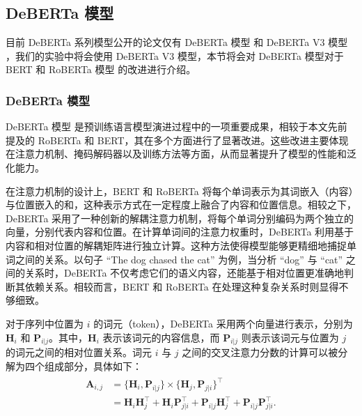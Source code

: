 \subsection{DeBERTa 模型}
\label{sec:method-pretrain-deberta}

目前 DeBERTa 系列模型公开的论文仅有 DeBERTa 模型 \cite{he_deberta_2021} 和 DeBERTa V3 模型 \cite{he2023debertav3improvingdebertausing}，我们的实验中将会使用 DeBERTa V3 模型，本节将会对 DeBERTa 模型对于 BERT \cite{devlin_bert_2019} 和 RoBERTa 模型 \cite{liu_roberta_2019} 的改进进行介绍。

\subsubsection{DeBERTa 模型}

DeBERTa 模型 \cite{he_deberta_2021} 是预训练语言模型演进过程中的一项重要成果，相较于本文先前提及的 RoBERTa 和 BERT，其在多个方面进行了显著改进。这些改进主要体现在注意力机制、掩码解码器以及训练方法等方面，从而显著提升了模型的性能和泛化能力。

在注意力机制的设计上，BERT 和 RoBERTa 将每个单词表示为其词嵌入（内容）与位置嵌入的和，这种表示方式在一定程度上融合了内容和位置信息。相较之下，DeBERTa 采用了一种创新的解耦注意力机制，将每个单词分别编码为两个独立的向量，分别代表内容和位置。在计算单词间的注意力权重时，DeBERTa 利用基于内容和相对位置的解耦矩阵进行独立计算。这种方法使得模型能够更精细地捕捉单词之间的关系。以句子 “The dog chased the cat” 为例，当分析 “dog” 与 “cat” 之间的关系时，DeBERTa 不仅考虑它们的语义内容，还能基于相对位置更准确地判断其依赖关系。相较而言，BERT 和 RoBERTa 在处理这种复杂关系时则显得不够细致。

对于序列中位置为 \(i\) 的词元（token），DeBERTa 采用两个向量进行表示，分别为 \(\mathbf{H}_{i}\) 和 \(\mathbf{P}_{i|j}\)。其中，\(\mathbf{H}_{i}\) 表示该词元的内容信息，而 \(\mathbf{P}_{i|j}\) 则表示该词元与位置为 \(j\) 的词元之间的相对位置关系。词元 \(i\) 与 \(j\) 之间的交叉注意力分数的计算可以被分解为四个组成部分，具体如下：
\begin{align}
\label{eq:deberta-attention}
\begin{split}
\mathbf{A}_{i, j} & = \{\mathbf{H}_{i}, \mathbf{P}_{i | j}\} \times \{\mathbf{H}_{j}, \mathbf{P}_{j | i}\}^{\intercal} \\
& = \mathbf{H}_{i}\mathbf{H}_{j}^{\intercal}+\mathbf{H}_{i}\mathbf{P}_{j | i}^{\intercal}+\mathbf{P}_{i | j}\mathbf{H}_{j}^{\intercal}+\mathbf{P}_{i | j}\mathbf{P}_{j | i}^{\intercal}.
\end{split}
\end{align}

